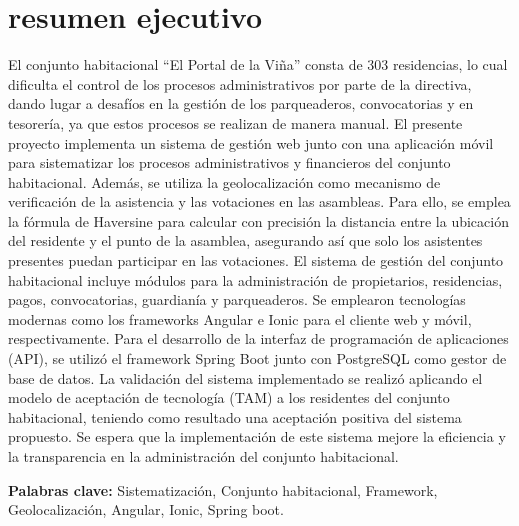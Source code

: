 \chapter*{resumen ejecutivo}

El conjunto habitacional {\textquotedblleft}El Portal de la Viña{\textquotedblright} consta de 303 residencias, lo cual dificulta el control de los procesos administrativos por parte de la directiva, dando lugar a desafíos en la gestión de los parqueaderos, convocatorias y en tesorería, ya que estos procesos se realizan de manera manual.
\bigbreak
El presente proyecto implementa un sistema de gestión web junto con una aplicación móvil para sistematizar los procesos administrativos y financieros del conjunto habitacional. Además, se utiliza la geolocalización como mecanismo de verificación de la asistencia y las votaciones en las asambleas. Para ello, se emplea la fórmula de Haversine para calcular con precisión la distancia entre la ubicación del residente y el punto de la asamblea, asegurando así que solo los asistentes presentes puedan participar en las votaciones.
\bigbreak
El sistema de gestión del conjunto habitacional incluye módulos para la administración de propietarios, residencias, pagos, convocatorias, guardianía y parqueaderos. Se emplearon tecnologías modernas como los frameworks Angular e Ionic para el cliente web y móvil, respectivamente. Para el desarrollo de la interfaz de programación de aplicaciones (API), se utilizó el framework Spring Boot junto con PostgreSQL como gestor de base de datos.
\bigbreak
La validación del sistema implementado se realizó aplicando el modelo de aceptación de tecnología (TAM) a los residentes del conjunto habitacional, teniendo como resultado una aceptación positiva del sistema propuesto. Se espera que la implementación de este sistema mejore la eficiencia y la transparencia en la administración del conjunto habitacional.

\vfill
\textbf{Palabras clave:} Sistematización, Conjunto habitacional, Framework, Geolocalización, Angular, Ionic, Spring boot.
